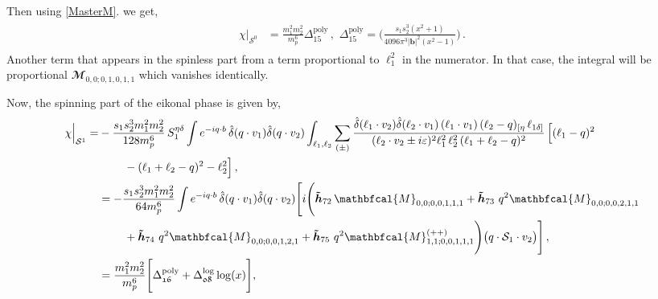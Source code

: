 Then using \eqref{MasterM}. we get, 
\begin{align}
    \begin{split}  \label{eqt9}      \chi\Big|_{\mathcal{S}^{0}}&=\frac{m_1^2m_2^2}{m_p^6}\Delta_{\mathfrak{15}}^{\textrm{poly}}\,,\,\, \Delta_{\mathfrak{15}}^{\textrm{poly}}=\Bigg(\frac{s_{1}s_{2}^3 \left(x^2+1\right)}{4096 \pi ^3 |\boldsymbol{b}|^2 \left(x^2-1\right)}\Bigg)\,.
         \end{split}
\end{align}
Another term that appears in the spinless part from a term proportional to $\ell_{1}^2$ in the numerator. In that case, the integral will be proportional $\mathbfcal{M}_{0,0;0,1,0,1,1}$ which vanishes identically.\par 
Now, the spinning part of the eikonal phase is given by,
\begin{align}
    \begin{split}
       \chi\Big|_{\mathcal{S}^1}=&-\frac{s_1 s_2^3m_1^2 m_2^2}{128 m_p^6}\, S_{1}^{\eta\delta}\int e^{-iq\cdot b} \,\hat\delta(q\cdot v_1)\hat\delta(q\cdot v_2)\int_{\ell_{1},\ell_{2}}\sum_{(\pm)}\frac{\hat\delta(\ell_{1}\cdot v_2)\hat\delta(\ell_{2}\cdot v_1)\,(\ell_{1}\cdot v_1) \,(\ell_2-q)_{[\eta} \, \ell_{1\delta]}}{(\ell_2\cdot v_2\pm i\varepsilon)^2\ell_{1}^2 \,\ell_{2}^2\,(\ell_{1}+\ell_{2}-q)^2}\,\Big[(\ell_{1}-q)^2\\ &
        \hspace{0.8cm}-(\ell_1+\ell_2-q)^2-\ell_2^2\Big]\,,\\&
        =-\frac{s_1 s_2^3m_1^2 m_2^2}{64 m_p^6}\int e^{-iq\cdot b} \,\hat\delta(q\cdot v_1)\hat\delta(q\cdot v_2)\Bigg[i \Bigg(\boldsymbol{\tilde h}_{72}\,\mathbfcal{M}_{0,0;0,0,1,1,1}+\boldsymbol{\tilde h}_{73}\,\,q^2
      \mathbfcal{M}_{0,0;0,0,2,1,1}\\& \hspace{0.8cm}+\boldsymbol{\tilde h}_{74}\,\,q^2\mathbfcal{M}_{0,0;0,0,1,2,1}+\boldsymbol{\tilde h}_{75}\,\,q^2\mathbfcal{M}^{(++)}_{1,1;0,0,1,1,1}
      \Bigg)\big(q\cdot\mathcal{S}_1\cdot v_2\big)\Bigg]\,,\\&=\frac{m_1^2m_2^2}{m_p^6}\Bigg[\Delta_{\mathfrak{16}}^{\textrm{poly}}+\Delta_{\mathfrak{08}}^{\textrm{log}}\log(x)\Bigg],\label{eqt10}      
    \end{split}
\end{align}
